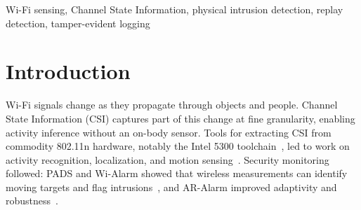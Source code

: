 \documentclass[conference]{IEEEtran}
\begin{document}
\begin{abstract}
Wi-Fi Channel State Information (CSI) enables device-free activity sensing, but does not by itself guarantee the integrity of measurements or stored evidence. EchoForensics proposes a zero-trust architecture comprising a physical-consistency verifier, an activity classifier, and a SHA-256 hash-chained evidence ledger. We evaluate the classification and ledger components using a synthetic four-class amplitude-only benchmark, group-wise splitting, and five random seeds. The Random Forest using eight engineered features achieves $98.87\pm0.48\%$ accuracy, and the RBF Support Vector Machine achieves $98.47\pm0.41\%$. The CNN--BiLSTM--Attention model achieves $81.47\pm1.07\%$ accuracy. An ablation study shows that removing the temporal-difference feature reduces feature-based model performance, indicating sensitivity to the synthetic replay-generation process. A software test confirms that the hash chain detects a targeted record modification when subsequent hashes are not recomputed. The proposed challenge--response verifier has not been implemented or experimentally evaluated. These results are limited to synthetic data and a software integrity test; they do not establish physical intrusion-detection performance. Evaluation with real Wi-Fi CSI and realistic replay attacks remains future work.
\end{abstract}

\begin{IEEEkeywords}
Wi-Fi sensing, Channel State Information, physical intrusion detection, replay detection, tamper-evident logging
\end{IEEEkeywords}

\section{Introduction}
Wi-Fi signals change as they propagate through objects and people. Channel State Information (CSI) captures part of this change at fine granularity, enabling activity inference without an on-body sensor. Tools for extracting CSI from commodity 802.11n hardware, notably the Intel 5300 toolchain~\cite{halperin2011}, led to work on activity recognition, localization, and motion sensing~\cite{wang2014eeyes,kotaru2015spotfi,yousefi2017,ma2019}. Security monitoring followed: PADS and Wi-Alarm showed that wireless measurements can identify moving targets and flag intrusions~\cite{qian2014pads,wang2019wialarm}, and AR-Alarm improved adaptivity and robustness~\cite{li2017aralarm}.
\end{document}
